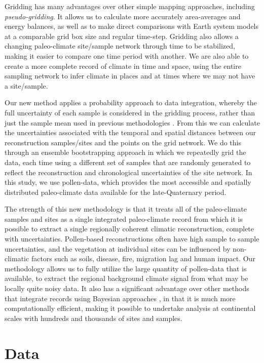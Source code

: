 \begin{refsection}
Gridding has many advantages over other simple mapping approaches, including \textit{pseudo-gridding}. It allows us to calculate more accurately area-averages and energy balances, as well as to make direct comparisons with Earth system models at a comparable grid box size and regular time-step. Gridding also allows a changing paleo-climate site/sample network through time to be stabilized, making it easier to compare one time period with another. We are also able to create a more complete record of climate in time and space, using the entire sampling network to infer climate in places and at times where we may not have a site/sample.

Our new method applies a probability approach to data integration, whereby the full uncertainty of each sample is considered in the gridding process, rather than just the sample mean used in previous methodologies \citep{MauriDavisCollinsEtAl2015}. From this we can calculate the uncertainties associated with the temporal and spatial distances between our reconstruction samples/sites and the points on the grid network. We do this through an ensemble bootstrapping approach in which we repeatedly grid the data, each time using a different set of samples that are randomly generated to reflect the reconstruction and chronological uncertainties of the site network. In this study, we use pollen-data, which provides the most accessible and spatially distributed paleo-climate data available for the late-Quaternary period. 

The strength of this new methodology is that it treats all of the paleo-climate samples and sites as a single integrated paleo-climate record from which it is possible to extract a single regionally coherent climatic reconstruction, complete with uncertainties. Pollen-based reconstructions often have high sample to sample uncertainties, and the vegetation at individual sites can be influenced by non-climatic factors such as soils, disease, fire, migration lag and human impact. Our methodology allows us to fully utilize the large quantity of pollen-data that is available, to extract the regional background climate signal from what may be locally quite noisy data. It also has a significant advantage over other methods that integrate records using Bayesian approaches \citep[e.g.][]{HolmstroemIlvonenSeppaeEtAl2015}, in that it is much more computationally efficient, making it possible to undertake analysis at continental scales with hundreds and thousands of sites and samples. 


\section{Data}  \label{sec:gridding-data}


\end{refsection}
